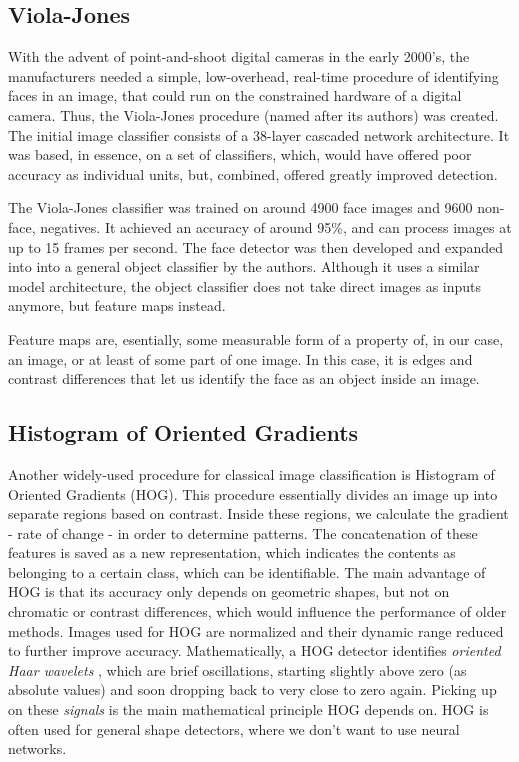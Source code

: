 \subsection{Viola-Jones}
With the advent of point-and-shoot digital cameras in the early 2000's, the manufacturers needed a simple, low-overhead, real-time procedure of identifying faces in an image, that could run on the constrained hardware of a digital camera. Thus, the Viola-Jones procedure (named after its authors) was created. The initial image classifier consists of a 38-layer cascaded network architecture. It was based, in essence, on a set of classifiers, which, would have offered poor accuracy as individual units, but, combined, offered greatly improved detection. \par 
The Viola-Jones classifier was trained on around 4900 face images and 9600 non-face, negatives. It achieved an accuracy of around 95\%, and can process images at up to 15 frames per second. \cite{viola_jones_1} The face detector was then developed and expanded into into a general object classifier by the authors. Although it uses a similar model architecture, the object classifier does not take direct images as inputs anymore, but feature maps instead. \cite{viola_jones_2} \par
Feature maps are, esentially, some measurable form of a property of, in our case, an image, or at least of some part of one image. \cite{pat_rec_springer} In this case, it is edges and contrast differences that let us identify the face as an object inside an image. 
\subsection{Histogram of Oriented Gradients}
Another widely-used procedure for classical image classification is Histogram of Oriented Gradients (HOG). This procedure essentially divides an image up into separate regions based on contrast. Inside these regions, we calculate the gradient - rate of change - in order to determine patterns. The concatenation of these features is saved as a new representation, which indicates the contents as belonging to a certain class, which can be identifiable. The main advantage of HOG is that its accuracy only depends on geometric shapes, but not on chromatic or contrast differences, which would influence the performance of older methods. Images used for HOG are normalized and their dynamic range reduced to further improve accuracy. \cite{HOG_humans} Mathematically, a HOG detector identifies \textit{oriented Haar wavelets} \cite{haar_1910}, which are brief oscillations, starting slightly above zero (as absolute values) and soon dropping back to very close to zero again. Picking up on these \textit{signals} is the main mathematical principle HOG depends on. HOG is often used for general shape detectors, where we don't want to use neural networks.
